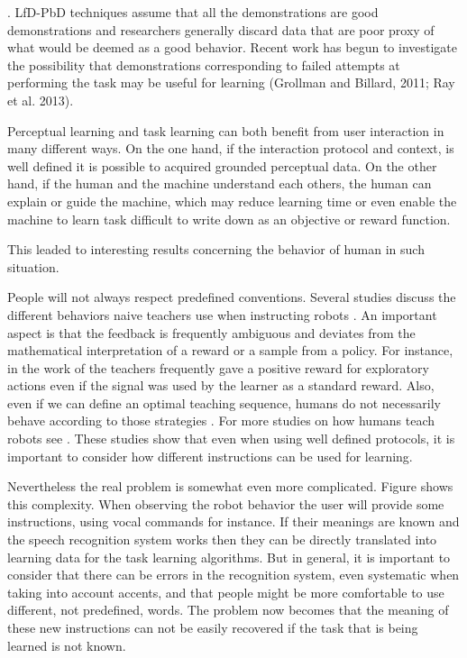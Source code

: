 . LfD-PbD techniques assume that all the demonstrations are good demonstrations and researchers generally discard data that are poor proxy of what would be deemed as a good behavior. Recent work has begun to investigate the possibility that demonstrations corresponding to failed attempts at performing the task may be useful for learning (Grollman and Billard, 2011; Ray et al. 2013).

Perceptual learning and task learning can both benefit from user interaction in many different ways. On the one hand, if the interaction protocol and context, is well defined it is possible to acquired grounded perceptual data. On the other hand, if the human and the machine understand each others, the human can explain or guide the machine, which may reduce learning time or even enable the machine to learn task difficult to write down as an objective or reward function.

This leaded to interesting results concerning the behavior of human in such situation.

People will not always respect predefined conventions. Several studies discuss the different behaviors naive teachers use when instructing robots \cite{thomaz2008teachable,Cakmak2010optimality}. An important aspect is that the feedback is frequently ambiguous and deviates from the mathematical interpretation of a reward or a sample from a policy. For instance, in the work of \cite{thomaz2008teachable} the teachers frequently gave a positive reward for exploratory actions even if the signal was used by the learner as a standard reward. Also, even if we can define an optimal teaching sequence, humans do not necessarily behave according to those strategies \cite{Cakmak2010optimality}. For more studies on how humans teach robots see \cite{thomaz2009learning,kaochar2011towards,knox2012humans}. These studies show that even when using well defined protocols, it is important to consider how different instructions can be used for learning. 

Nevertheless the real problem is somewhat even more complicated. Figure shows this complexity. When observing the robot behavior the user will provide some instructions, using vocal commands for instance. If their meanings are known and the speech recognition system works then they can be directly translated into learning data for the task learning algorithms. But in general, it is important to consider that there can be errors in the recognition system, even systematic when taking into account accents, and that people might be more comfortable to use different, not predefined, words. The problem now becomes that the meaning of these new instructions can not be easily recovered if the task that is being learned is not known.


